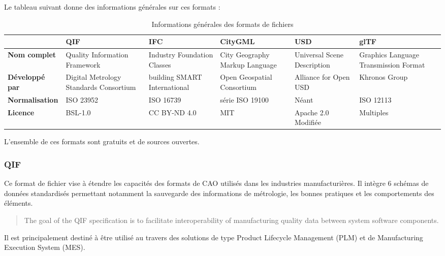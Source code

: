 Le tableau suivant donne des informations générales sur ces formats :

\begin{table}[!h]
    \centering
    \caption{Informations générales des formats de fichiers}
    \renewcommand{\arraystretch}{1.5} 
    \begin{tabularx}{\textwidth}{|l|X|X|X|X|X|} 
        \hline
        \rowcolor{white!75!black} \textbf{} & \textbf{QIF\cite{githubGitHubQualityInformationFrameworkqifcommunity}} & \textbf{IFC\cite{githubGitHubBuildingSMARTIFC43xdevelopment}} & \textbf{CityGML\cite{githubGitHubOpengeospatialCityGML30CM}} & \textbf{USD\cite{githubGitHubPixarAnimationStudiosOpenUSD}} & \textbf{glTF\cite{githubGitHubKhronosGroupglTF}}\\
        \hline
        \textbf{Nom complet} & Quality Information Framework & Industry Foundation Classes & City Geography Markup Language & Universal Scene Description & Graphics Language Transmission Format\\
        \hline
        \textbf{Développé par} & Digital Metrology Standards Consortium & building SMART International & Open Geospatial Consortium & Alliance for Open USD & Khronos Group \\
        \hline
        \textbf{Normalisation} & ISO 23952 & ISO 16739 & série ISO 19100 & Néant & ISO 12113 \\
        \hline
        \textbf{Licence} & BSL-1.0 & CC BY-ND 4.0 & MIT & Apache 2.0 Modifiée &  Multiples \\
        \hline
    \end{tabularx}
\end{table}

L'ensemble de ces formats sont gratuits et de sources ouvertes.

\newpage

\subsubsection{QIF}
Ce format de fichier vise à étendre les capacités des formats de CAO utilisés dans les industries manufacturières. Il intègre 6 schémas de données standardisés permettant notamment la sauvegarde des informations de métrologie, les bonnes pratiques et les comportements des éléments.
\begin{quote}
    The goal of the QIF specification is to facilitate interoperability of manufacturing quality data between system software components. \cite{QualityInformationFramework2018}
\end{quote}
Il est principalement destiné à être utilisé au travers des solutions de type Product Lifecycle Management (PLM) et de Manufacturing Execution System (MES).

